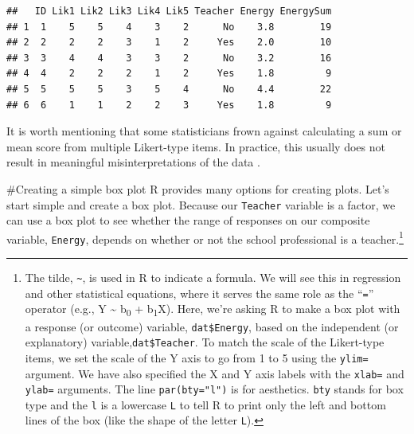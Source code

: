 \documentclass[]{tufte-handout}
\newenvironment{Shaded}{}{}
\newcommand{\DataTypeTok}[1]{\textcolor[rgb]{0.56,0.13,0.00}{#1}}
\newcommand{\DecValTok}[1]{\textcolor[rgb]{0.25,0.63,0.44}{#1}}
\newcommand{\KeywordTok}[1]{\textcolor[rgb]{0.00,0.44,0.13}{\textbf{#1}}}
\newcommand{\NormalTok}[1]{#1}
\newcommand{\OperatorTok}[1]{\textcolor[rgb]{0.40,0.40,0.40}{#1}}
\newcommand{\StringTok}[1]{\textcolor[rgb]{0.25,0.44,0.63}{#1}}
\begin{document}
\begin{verbatim}
##   ID Lik1 Lik2 Lik3 Lik4 Lik5 Teacher Energy EnergySum
## 1  1    5    5    4    3    2      No    3.8        19
## 2  2    2    2    3    1    2     Yes    2.0        10
## 3  3    4    4    3    3    2      No    3.2        16
## 4  4    2    2    2    1    2     Yes    1.8         9
## 5  5    5    5    3    5    4      No    4.4        22
## 6  6    1    1    2    2    3     Yes    1.8         9
\end{verbatim}

It is worth mentioning that some statisticians frown against calculating
a sum or mean score from multiple Likert-type items. In practice, this
usually does not result in meaningful misinterpretations of the data
\citep{norman_likert_2010}.

\#Creating a simple box plot R provides many options for creating plots.
Let's start simple and create a box plot. Because our \texttt{Teacher}
variable is a factor, we can use a box plot to see whether the range of
responses on our composite variable, \texttt{Energy}, depends on whether
or not the school professional is a teacher.\footnote{The tilde,
  \texttt{\textasciitilde{}}, is used in R to indicate a formula. We
  will see this in regression and other statistical equations, where it
  serves the same role as the ``\texttt{=}'' operator (e.g., Y
  \textasciitilde{} b\textsubscript{0} + b\textsubscript{1}X). Here,
  we're asking R to make a box plot with a response (or outcome)
  variable, \texttt{dat\$Energy}, based on the independent (or
  explanatory) variable,\texttt{dat\$Teacher}. To match the scale of the
  Likert-type items, we set the scale of the Y axis to go from 1 to 5
  using the \texttt{ylim=} argument. We have also specified the X and Y
  axis labels with the \texttt{xlab=} and \texttt{ylab=} arguments. The
  line \texttt{par(bty="l")} is for aesthetics. \texttt{bty} stands for
  box type and the \texttt{l} is a lowercase \texttt{L} to tell R to
  print only the left and bottom lines of the box (like the shape of the
  letter \texttt{L}).}

\begin{Shaded}
\end{Shaded}
\end{document}
